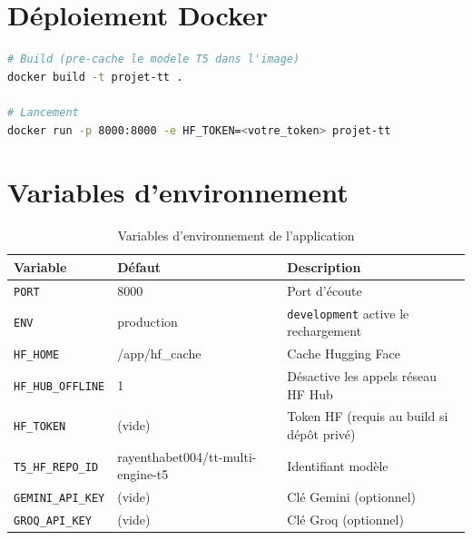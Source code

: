 \documentclass[12pt,a4paper]{report}
\begin{document}
\section{D\'eploiement Docker}

\begin{lstlisting}[language=bash,caption={Docker build et run},label=lst:docker]
# Build (pre-cache le modele T5 dans l'image)
docker build -t projet-tt .

# Lancement
docker run -p 8000:8000 -e HF_TOKEN=<votre_token> projet-tt
\end{lstlisting}

\section{Variables d'environnement}

\begin{table}[H]
  \centering
  \caption{Variables d'environnement de l'application}
  \label{tab:env_vars}
  \begin{tabularx}{\textwidth}{llX}
    \toprule
    \textbf{Variable} & \textbf{D\'efaut} & \textbf{Description} \\
    \midrule
    \texttt{PORT}             & 8000       & Port d'\'ecoute \\
    \texttt{ENV}              & production & \texttt{development} active le rechargement \\
    \texttt{HF\_HOME}         & /app/hf\_cache & Cache Hugging Face \\
    \texttt{HF\_HUB\_OFFLINE} & 1          & D\'esactive les appels r\'eseau HF Hub \\
    \texttt{HF\_TOKEN}        & (vide)     & Token HF (requis au build si d\'ep\^ot priv\'e) \\
    \texttt{T5\_HF\_REPO\_ID} & rayenthabet004/tt-multi-engine-t5 & Identifiant mod\`ele \\
    \texttt{GEMINI\_API\_KEY} & (vide)     & Cl\'e Gemini (optionnel) \\
    \texttt{GROQ\_API\_KEY}   & (vide)     & Cl\'e Groq (optionnel) \\
    \bottomrule
  \end{tabularx}
\end{table}
\end{document}
